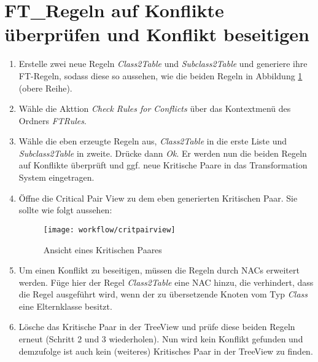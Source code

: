 \section{FT\_Regeln auf Konflikte überprüfen und Konflikt beseitigen}
\begin{enumerate}
\item Erstelle zwei neue Regeln \textit{Class2Table} und \textit{Subclass2Table} und generiere ihre FT-Regeln, sodass diese so aussehen, wie die beiden Regeln in Abbildung \ref{fig:critpairview} (obere Reihe).

\item Wähle die Akttion \textit{Check Rules for Conflicts} über das Kontextmenü des Ordners \textit{FTRules}.

\item Wähle die eben erzeugte Regeln aus, \textit{Class2Table} in die erste Liste und \textit{Subclass2Table} in zweite. Drücke dann \textit{Ok}. Er werden nun die beiden Regeln auf Konflikte überprüft und ggf. neue Kritische Paare in das Transformation System eingetragen.

\item Öffne die Critical Pair View zu dem eben generierten Kritischen Paar. Sie sollte wie folgt aussehen:

\begin{figure}[h!]
	\centering
	\texttt{[image: workflow/critpairview]}
	\caption{Ansicht eines Kritischen Paares}
	\label{fig:critpairview}
\end{figure}	

\item Um einen Konflikt zu beseitigen, müssen die Regeln durch NACs erweitert werden. Füge hier der Regel \textit{Class2Table} eine NAC hinzu, die verhindert, dass die Regel ausgeführt wird, wenn der zu übersetzende Knoten vom Typ \textit{Class} eine Elternklasse besitzt.

\item Lösche das Kritische Paar in der TreeView und prüfe diese beiden Regeln erneut (Schritt 2 und 3 wiederholen). Nun wird kein Konflikt gefunden und demzufolge ist auch kein (weiteres) Kritisches Paar in der TreeView zu finden.

\end{enumerate}



